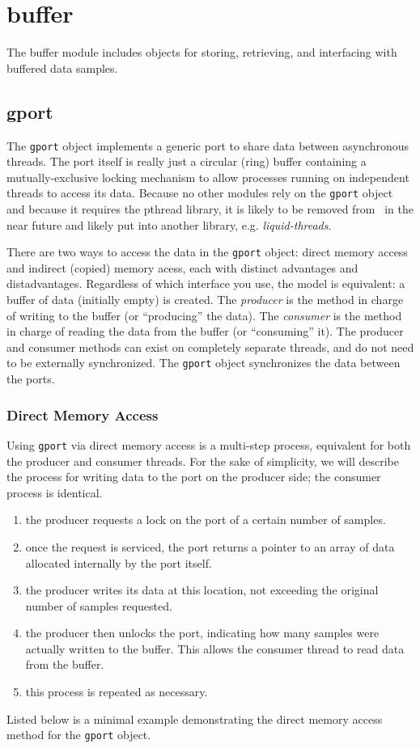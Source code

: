 % 
%
\section{buffer}
\label{module:buffer}
The buffer module includes objects for storing, retrieving, and interfacing
with buffered data samples.

%
%
\subsection{gport}
\label{module:buffer:gport}
The {\tt gport} object implements a generic port to share data between
asynchronous threads.
The port itself is really just a circular (ring) buffer containing a
mutually-exclusive locking mechanism to allow processes running on independent
threads to access its data.
Because no other modules rely on the {\tt gport} object and because it
requires the pthread library, it is likely to be removed from \liquid\ in the
near future and likely put into another library, e.g. {\em liquid-threads}.

There are two ways to access the data in the {\tt gport} object: direct memory
access and indirect (copied) memory acess, each with distinct advantages and
distadvantages.
Regardless of which interface you use, the model is equivalent:
a buffer of data (initially empty) is created.
The {\it producer} is the method in charge of writing to the buffer (or
``producing'' the data).
The {\it consumer} is the method in charge of reading the data from the buffer
(or ``consuming'' it).
The producer and consumer methods can exist on completely separate threads,
and do not need to be externally synchronized.
The {\tt gport} object synchronizes the data between the ports.

\subsubsection{Direct Memory Access}
Using {\tt gport} via direct memory access is a multi-step process, equivalent
for both the producer and consumer threads.
For the sake of simplicity, we will describe the process for writing data to
the port on the producer side; the consumer process is identical.
%
\begin{enumerate}
\item the producer requests a lock on the port of a certain number of samples.
\item once the request is serviced, the port returns a pointer to an array of
      data allocated internally by the port itself.
\item the producer writes its data at this location, not exceeding the
      original number of samples requested.
\item the producer then unlocks the port, indicating how many samples were
      actually written to the buffer.
      This allows the consumer thread to read data from the buffer.
\item this process is repeated as necessary.
\end{enumerate}
%
Listed below is a minimal example demonstrating the direct memory access
method for the {\tt gport} object.
%

%


